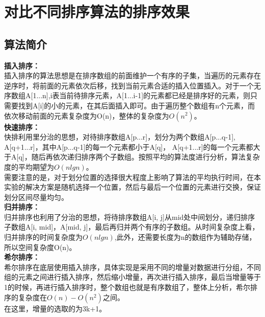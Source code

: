 \documentclass[UTF8]{ctexart}
\begin{document}

\section{对比不同排序算法的排序效果}

\subsection{算法简介}

\textbf{插入排序：}\\
插入排序的算法思想是在排序数组的前面维护一个有序的子集，当遍历的元素存在逆序时，将前面的元素依次后移，找到当前元素合适的插入位置插入。对于一个无序数组A[1...n],i表当前待排序元素，A[1...i-1]的元素都已经是排序好的元素，则只需要找到A[i]的小的元素，在其后面插入即可。由于遍历整个数组有n个元素，而依次移动前面的元素复杂度为O(n)，整体的复杂度为$O(n^2)。$\\

\textbf{快速排序：}\\
快排利用里分治的思想，对待排序数组A[p...r]，划分为两个数组A[p...q-1], A[q+1...r]，其中A[p...q-1]的每一个元素都小于A[q]， A[q+1...r]的每一个元素都大于A[q]，随后再依次递归排序两个子数组。按照平均的算法度进行分析，算法复杂度的平均期望为$O(nlgn)$。\\
需要注意的是，对于划分位置的选择很大程度上影响了算法的平均执行时间，在本实验的解决方案是随机选择一个位置，然后与最后一个位置的元素进行交换，保证划分区间尽量均匀。\\

\textbf{归并排序：}\\
归并排序也利用了分治的思想，将待排序数组A[i, j]从mid处中间划分，递归排序子数组A[i, mid]，A[mid, j]，最后再归并两个有序的子数组。从时间复杂度上看，归并排序的时间复杂度为$O(nlgn)$,此外，还需要长度为n的数组作为辅助存储，所以空间复杂度O(n)。\\

\textbf{希尔排序：}\\
希尔排序在底层使用插入排序，具体实现是采用不同的增量对数据进行分组，不同组的元素之间进行插入排序，然后缩小增量，再次进行插入排序，最后当增量等于1的时候，再进行插入排序时，整个数组也就是有序数组了，整体上分析，希尔排序的复杂度在$O(n)-O(n^2)$之间。\\
在这里，增量的选取的为3k+1。\\
\end{document}
